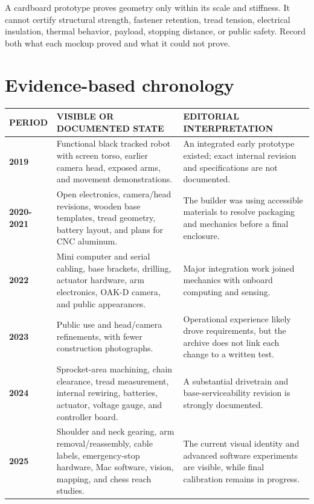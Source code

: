 \documentclass[10pt,openany]{book}
\begin{document}
\begin{advancedbox}
A cardboard prototype proves geometry only within its scale and stiffness. It cannot certify structural strength, fastener retention, tread tension, electrical insulation, thermal behavior, payload, stopping distance, or public safety. Record both what each mockup proved and what it could not prove.
\end{advancedbox}

\section{Evidence-based chronology}

\begin{tabularx}{\textwidth}{>{\robcondensed\bfseries\color{ROBAccent}}p{0.72in} X X}
\toprule
PERIOD & VISIBLE OR DOCUMENTED STATE & EDITORIAL INTERPRETATION\\
\midrule
2019 & Functional black tracked robot with screen torso, earlier camera head, exposed arms, and movement demonstrations. & An integrated early prototype existed; exact internal revision and specifications are not documented.\\
2020-2021 & Open electronics, camera/head revisions, wooden base templates, tread geometry, battery layout, and plans for CNC aluminum. & The builder was using accessible materials to resolve packaging and mechanics before a final enclosure.\\
2022 & Mini computer and serial cabling, base brackets, drilling, actuator hardware, arm electronics, OAK-D camera, and public appearances. & Major integration work joined mechanics with onboard computing and sensing.\\
2023 & Public use and head/camera refinements, with fewer construction photographs. & Operational experience likely drove requirements, but the archive does not link each change to a written test.\\
2024 & Sprocket-area machining, chain clearance, tread measurement, internal rewiring, batteries, actuator, voltage gauge, and controller board. & A substantial drivetrain and base-serviceability revision is strongly documented.\\
2025 & Shoulder and neck gearing, arm removal/reassembly, cable labels, emergency-stop hardware, Mac software, vision, mapping, and chess reach studies. & The current visual identity and advanced software experiments are visible, while final calibration remains in progress.\\
\bottomrule
\end{tabularx}
\end{document}
